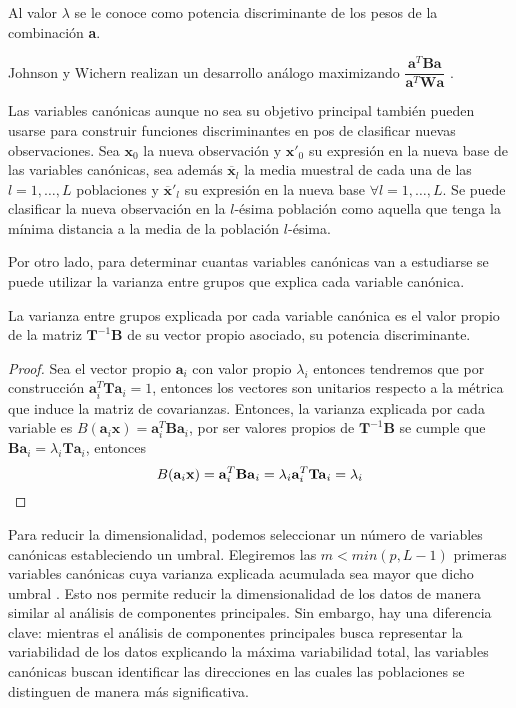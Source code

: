 \begin{defi}
Al valor $\lambda$ se le conoce como potencia discriminante de los pesos de la combinación \textbf{a}.
\end{defi}
\noindent Johnson y Wichern realizan un desarrollo análogo maximizando $\dfrac{\textbf{a}^T \textbf{B}\textbf{a}}{\textbf{a}^T \textbf{W}\textbf{a}}$ \cite{Johnson 2007}. 

\noindent Las variables canónicas aunque no sea su objetivo principal también pueden usarse para construir funciones discriminantes en pos de clasificar nuevas observaciones. Sea $\mathbf{x}_0$ la nueva observación y $\mathbf{x}'_0$ su expresión en la nueva base de las variables canónicas, sea además $\overline{\mathbf{x}}_l$ la media muestral de cada una de las $l=1,\ldots, L$ poblaciones y $\overline{\mathbf{x}}'_l$ su expresión en la nueva base $\forall l=1,\ldots, L$. Se puede clasificar la nueva observación en la $l$-ésima población como aquella que tenga la mínima distancia a la media de la población $l$-ésima. 

\noindent Por otro lado, para determinar cuantas variables canónicas van a estudiarse se puede utilizar la varianza entre grupos que explica cada variable canónica. 

\begin{propo}
La varianza entre grupos explicada por cada variable canónica es el valor propio de la matriz $\mathbf{T}^{-1} \mathbf{B}$ de su vector propio asociado, su potencia discriminante. 
\begin{proof}
Sea el vector propio $\textbf{a}_i$ con valor propio $\lambda_i$ entonces tendremos que por construcción $\mathbf{a}_i^T \mathbf{T a}_i=1$, entonces los vectores son unitarios respecto a la métrica que induce la matriz de covarianzas. Entonces,  la varianza explicada por cada variable es $B(\textbf{a}_i\mathbf{x})=\mathbf{a}_i^T\mathbf{Ba}_i$, por ser valores propios de $\mathbf{T}^{-1}\mathbf{B}$ se cumple que $\mathbf{Ba}_i=\lambda_i \mathbf{T a}_i$, entonces
\begin{equation}
B(\textbf{a}_i\mathbf{x})=\mathbf{a}_i^T\mathbf{Ba}_i=\lambda_i \mathbf{a}_i^T\mathbf{Ta}_i=\lambda_i\qedhere
\end{equation}
\end{proof}
\end{propo}


\noindent Para reducir la dimensionalidad, podemos seleccionar un número de variables canónicas estableciendo un umbral. Elegiremos las $m< min(p,L-1)$ primeras variables canónicas cuya varianza explicada acumulada sea mayor que dicho umbral \cite{Johnson 2007}. Esto nos permite reducir la dimensionalidad de los datos de manera similar al análisis de componentes principales. Sin embargo, hay una diferencia clave: mientras el análisis de componentes principales busca representar la variabilidad de los datos explicando la máxima variabilidad total, las variables canónicas buscan identificar las direcciones en las cuales las poblaciones se distinguen de manera más significativa.

